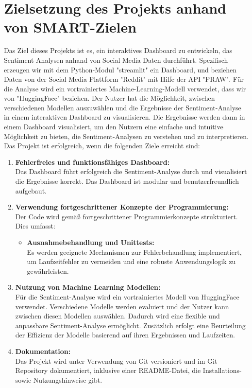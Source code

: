 \sloppy
\section{Zielsetzung des Projekts anhand von SMART-Zielen}
Das Ziel dieses Projekts ist es, ein interaktives Dashboard zu entwickeln, das Sentiment-Analysen anhand von Social Media Daten durchführt.
Spezifisch erzeugen wir mit dem Python-Modul "streamlit" ein Dashboard, und beziehen Daten von der Social Media Plattform "Reddit" mit Hilfe der API "PRAW".
Für die Analyse wird ein vortrainiertes Machine-Learning-Modell verwendet, dass wir von "HuggingFace" beziehen.
Der Nutzer hat die Möglichkeit, zwischen verschiedenen Modellen auszuwählen und die Ergebnisse der Sentiment-Analyse in einem interaktiven Dashboard zu visualisieren. 
Die Ergebnisse werden dann in einem Dashboard visualisiert, um den Nutzern eine einfache und intuitive Möglichkeit zu bieten, die Sentiment-Analysen zu verstehen und zu interpretieren.
\\
Das Projekt ist erfolgreich, wenn die folgenden Ziele erreicht sind:
\begin{enumerate}
    \item \textbf{Fehlerfreies und funktionsfähiges Dashboard: } \\
    Das Dashboard führt erfolgreich die Sentiment-Analyse durch und visualisiert die Ergebnisse korrekt. Das Dashboard ist modular und benutzerfreundlich aufgebaut.
    \item \textbf{Verwendung fortgeschrittener Konzepte der Programmierung:} \\
    Der Code wird gemäß fortgeschrittener Programmierkonzepte strukturiert. Dies umfasst:

    \begin{itemize}
        \item \textbf{Ausnahmebehandlung und Unittests: } \\
        Es werden geeignete Mechanismen zur Fehlerbehandlung implementiert, um Laufzeitfehler zu vermeiden und eine robuste Anwendungslogik zu gewährleisten.
    \end{itemize}
    \newpage

    \item \textbf{Nutzung von Machine Learning Modellen: } \\
    Für die Sentiment-Analyse wird ein vortrainiertes Modell von HuggingFace verwendet.
    Verschiedene Modelle werden evaluiert und der Nutzer kann zwischen diesen Modellen auswählen.
    Dadurch wird eine flexible und anpassbare Sentiment-Analyse ermöglicht.
    Zusätzlich erfolgt eine Beurteilung der Effizienz der Modelle basierend auf ihren Ergebnissen und Laufzeiten.

    \item \textbf{Dokumentation:} \\
    Das Projekt wird unter Verwendung von Git versioniert und im Git-Repository dokumentiert, inklusive einer README-Datei, die Installations- sowie Nutzungshinweise gibt.
\end{enumerate}\\
